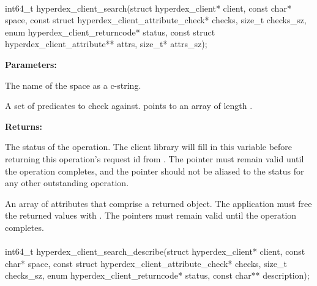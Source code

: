 \paragraph{}
\label{api:c:search}
\begin{ccode}
int64_t hyperdex_client_search(struct hyperdex_client* client,
        const char* space,
        const struct hyperdex_client_attribute_check* checks, size_t checks_sz,
        enum hyperdex_client_returncode* status,
        const struct hyperdex_client_attribute** attrs, size_t* attrs_sz);
\end{ccode}
\funcdesc 

\noindent\textbf{Parameters:}
\begin{description}[labelindent=\widthof{{\code{checks}, \code{checks\_sz}}},leftmargin=*,noitemsep,nolistsep,align=right]
\item[\code{space}] The name of the space as a c-string.
\item[\code{checks}, \code{checks\_sz}] A set of predicates to check against.   points to an array of length .
\end{description}

\noindent\textbf{Returns:}
\begin{description}[labelindent=\widthof{{\code{attrs}, \code{attrs\_sz}}},leftmargin=*,noitemsep,nolistsep,align=right]
\item[\code{status}] The status of the operation.  The client library will fill in this variable before returning this operation's request id from .  The pointer must remain valid until the operation completes, and the pointer should not be aliased to the status for any other outstanding operation.
\item[\code{attrs}, \code{attrs\_sz}] An array of attributes that comprise a returned object.  The application must free the returned values with .  The pointers must remain valid until the operation completes.
\end{description}

\paragraph{}
\label{api:c:search_describe}
\begin{ccode}
int64_t hyperdex_client_search_describe(struct hyperdex_client* client,
        const char* space,
        const struct hyperdex_client_attribute_check* checks, size_t checks_sz,
        enum hyperdex_client_returncode* status,
        const char** description);
\end{ccode}
\funcdesc 

